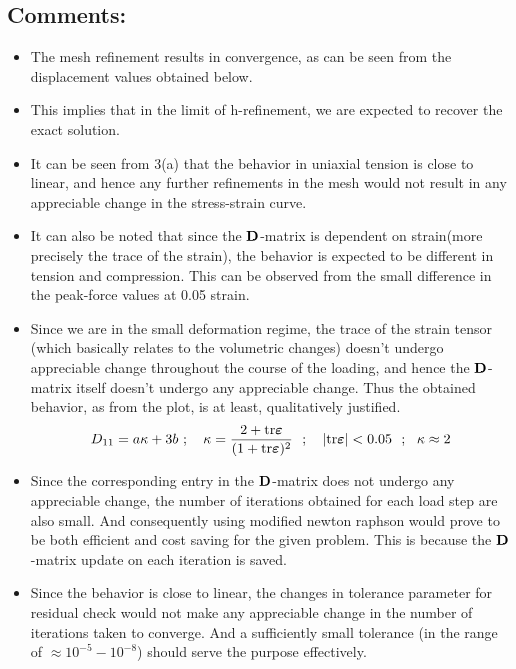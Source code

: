 \subsection*{Comments:}
\begin{itemize}
\item The mesh refinement results in convergence, as can be seen from the displacement values obtained below. 
\item This implies that in the limit of h-refinement, we are expected to recover the exact solution. 
\item It can be seen from 3(a) that the behavior in uniaxial tension is close to linear, and hence any further refinements in the mesh would not result in any appreciable change in the stress-strain curve. 
\item It can also be noted that since the $\bf D$-matrix is dependent on strain(more precisely the trace of the strain), the behavior is expected to be different in tension and compression. This can be observed from the small difference in the peak-force values at 0.05 strain. 
\item Since we are in the small deformation regime, the trace of the strain tensor (which basically relates to the volumetric changes) doesn't undergo appreciable change throughout the course of the loading, and hence the $\bf D$-matrix itself doesn't undergo any appreciable change. Thus the obtained behavior, as from the plot, is at least, qualitatively justified.  
\begin{align*}
D_{11}
=
a\kappa + 3b\ ; \ \ \ \kappa = \frac{2+{\rm tr}{\bm\varepsilon}}{(1+{\rm tr}{\bm\varepsilon})^2}\ \ ; \ \ \ |{\rm tr}{\bm\varepsilon}|<0.05\ \ ; \ \ \kappa\approx 2
\end{align*}
\item Since the corresponding entry in the $\bf D$-matrix does not undergo any appreciable change, the number of iterations obtained for each load step are also small. And consequently using modified newton raphson would prove to be both efficient and cost saving for the given problem. This is because the $\bf D$-matrix update on each iteration is saved.
\item Since the behavior is close to linear, the changes in tolerance parameter for residual check would not make any appreciable change in the number of iterations taken to converge. And a sufficiently small tolerance (in the range of $\approx 10^{-5} - 10^{-8}$) should serve the purpose effectively. 
\end{itemize}

